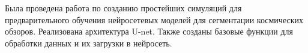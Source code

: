 \Conclusion %

Была проведена работа по созданию простейших симуляций для предварительного обучения нейросетевых 
моделей для сегментации космических обзоров. Реализована архитектура U-net. Также созданы базовые 
функции для обработки данных и их загрузки в нейросеть.
